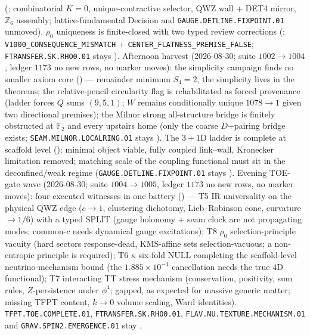 \documentclass[11pt,a4paper]{article}
\begin{document}
\begin{keybox}
(;
combinatorial $K=0$, unique-contractive selector, QWZ wall $+$ DET4 mirror, $\mathbb Z_6$
assembly; lattice-fundamental Decision and \texttt{GAUGE.DETLINE.FIXPOINT.01} unmoved).
$\rho_0$ uniqueness is finite-closed with two typed review corrections
(;
\texttt{V1000\_CONSEQUENCE\_MISMATCH} $+$ \texttt{CENTER\_FLATNESS\_PREMISE\_FALSE};
\texttt{FTRANSFER.SK.RHO0.01} stays \mO).
Afternoon harvest (2026-08-30; suite $1002\to1004$, ledger $1173$ no new rows, no marker moves):
the simplicity campaign finds no smaller axiom core
() ---
remainder minimum $S_4=2$, the simplicity lives in the theorems; the relative-pencil
circularity flag is rehabilitated as forced provenance (ladder forces $Q$ sums $(9,5,1)$;
$W$ remains conditionally unique $1078\to1$ given two directional premises);
the Milnor strong all-structure bridge is finitely obstructed at $\mathbb F_2$ and every
upstairs home (only the coarse $D$+pairing bridge exists;
\texttt{SEAM.MILNOR.LOCALRING.01} stays \mO).
The $3{+}1$D ladder is complete at scaffold level
():
minimal object viable, fully coupled link--wall, Kronecker limitation removed;
matching scale of the coupling functional must sit in the deconfined/weak regime
(\texttt{GAUGE.DETLINE.FIXPOINT.01} stays \mO).
Evening TOE-gate wave (2026-08-30; suite $1004\to1005$, ledger $1173$ no new rows, no marker moves):
four executed witnesses in one battery
() ---
T5 IR universality on the physical QWZ edge ($c\to1$, clustering dichotomy, Lieb--Robinson cone, curvature $\to1/6$) with a typed SPLIT (gauge holonomy $+$ seam clock are not propagating modes; common-$c$ needs dynamical gauge excitations);
T8 $\rho_0$ selection-principle vacuity (hard sectors response-dead, KMS-affine sets selection-vacuous; a non-entropic principle is required);
T6 $\kappa$ six-fold NULL completing the scaffold-level neutrino-mechanism bound (the $1.885{\times}10^{-4}$ cancellation needs the true $4$D functional);
T7 interacting TT stress mechanism (conservation, positivity, sum rules, $Z$-persistence under $\phi^4$; gapped, as expected for massive generic matter; missing TFPT content, $k\to0$ volume scaling, Ward identities).
\texttt{TFPT.TOE.COMPLETE.01}, \texttt{FTRANSFER.SK.RHO0.01},
\texttt{FLAV.NU.TEXTURE.MECHANISM.01} and \texttt{GRAV.SPIN2.EMERGENCE.01} stay \mO.

\end{keybox}
\end{document}
